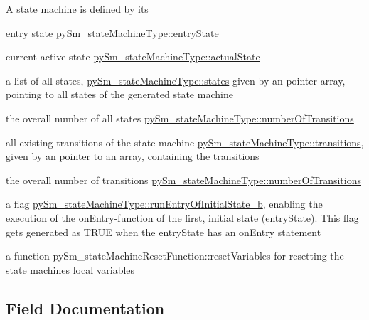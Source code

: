 A state machine is defined by it\textquotesingle{}s
\begin{DoxyItemize}
\item entry state \hyperlink{structpySm__stateMachineType_ac9896d220e5e80df257943742f47f6d0}{py\+Sm\+\_\+state\+Machine\+Type\+::entry\+State}
\item current active state \hyperlink{structpySm__stateMachineType_afff58d3fb0afd9064dfccf4f58cdb8b5}{py\+Sm\+\_\+state\+Machine\+Type\+::actual\+State}
\item a list of all states, \hyperlink{structpySm__stateMachineType_a6b964357abaeecf851825d1203a59582}{py\+Sm\+\_\+state\+Machine\+Type\+::states} given by an pointer array, pointing to all states of the generated state machine
\item the overall number of all states \hyperlink{structpySm__stateMachineType_a3d4035a87cce41845ae138aa2a279e20}{py\+Sm\+\_\+state\+Machine\+Type\+::number\+Of\+Transitions}
\item all existing transitions of the state machine \hyperlink{structpySm__stateMachineType_a3f35562e1b353b47e2a90a957882a610}{py\+Sm\+\_\+state\+Machine\+Type\+::transitions}, given by an pointer to an array, containing the transitions
\item the overall number of transitions \hyperlink{structpySm__stateMachineType_a3d4035a87cce41845ae138aa2a279e20}{py\+Sm\+\_\+state\+Machine\+Type\+::number\+Of\+Transitions}
\item a flag \hyperlink{structpySm__stateMachineType_a3320131411f6304cba856edbcfedd060}{py\+Sm\+\_\+state\+Machine\+Type\+::run\+Entry\+Of\+Initial\+State\+\_\+b}, enabling the execution of the on\+Entry-\/function of the first, initial state (entry\+State). This flag get\textquotesingle{}s generated as T\+R\+UE when the entry\+State has an on\+Entry statement
\item a function py\+Sm\+\_\+state\+Machine\+Reset\+Function\+::reset\+Variables for resetting the state machine\textquotesingle{}s local variables 
\end{DoxyItemize}

\subsection{Field Documentation}
\mbox{\label{structpySm__stateMachineType_afff58d3fb0afd9064dfccf4f58cdb8b5}} 
